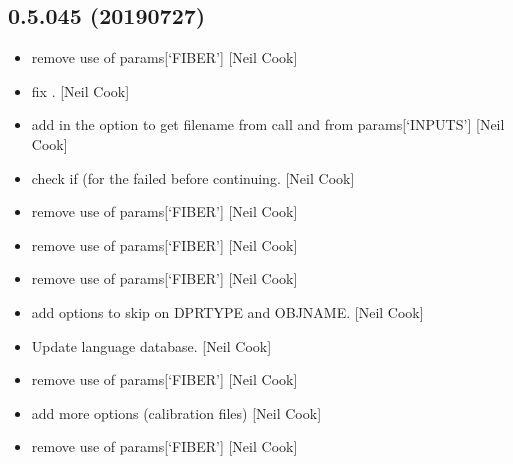\documentclass[a4paper,10pt,english]{report}
\begin{document}
\subsection{0.5.045 (2019\sphinxhyphen{}07\sphinxhyphen{}27)}
\label{\detokenize{misc/changelog:id116}}\begin{itemize}
\item {} 
 \sphinxhyphen{} remove use of params{[}‘FIBER’{]} {[}Neil
Cook{]}

\item {} 
 \sphinxhyphen{} fix . {[}Neil Cook{]}

\item {} 
 \sphinxhyphen{} add in the option to get filename from call and from
params{[}‘INPUTS’{]} {[}Neil Cook{]}

\item {} 
 \sphinxhyphen{} check if  (for the 
failed before continuing. {[}Neil Cook{]}

\item {} 
 \sphinxhyphen{} remove use of params{[}‘FIBER’{]} {[}Neil Cook{]}

\item {} 
 \sphinxhyphen{} remove use of params{[}‘FIBER’{]} {[}Neil Cook{]}

\item {} 
 \sphinxhyphen{} remove use of params{[}‘FIBER’{]} {[}Neil Cook{]}

\item {} 
 \sphinxhyphen{} add options to skip on DPRTYPE and OBJNAME.
{[}Neil Cook{]}

\item {} 
Update language database. {[}Neil Cook{]}

\item {} 
 \sphinxhyphen{} remove use of params{[}‘FIBER’{]} {[}Neil Cook{]}

\item {} 
 \sphinxhyphen{} add more options (calibration files) {[}Neil
Cook{]}

\item {} 
 \sphinxhyphen{} remove use of params{[}‘FIBER’{]} {[}Neil Cook{]}


\end{itemize}
\end{document}

